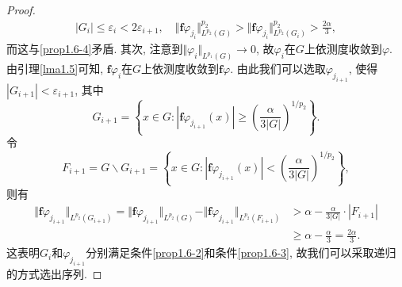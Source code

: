 \begin{proposition}
\begin{proof}
        \begin{align*}
            |G_i| \leq \varepsilon_i < 2\varepsilon_{i + 1}, \quad \Vert \bm{f}\varphi_{j_i}\Vert_{L^{p_2}(G)}^{p_2} > \Vert \bm{f}\varphi_{j_i}\Vert_{L^{p_2}(G_i)}^{p_2} > \frac{2\alpha}{3},
        \end{align*}
        而这与\ref{prop1.6-4}矛盾. 其次, 注意到$\Vert \varphi_i\Vert_{L^{p_1}(G)} \rightarrow 0$, 故$\varphi_i$在$G$上依测度收敛到$\varphi$. 由引理\ref{lma1.5}可知, $\bm{f}\varphi_i$在$G$上依测度收敛到$\bm{f}\varphi$. 由此我们可以选取$\varphi_{j_{i + 1}}$, 使得$|G_{i + 1}| < \varepsilon_{i + 1}$, 其中 
        \begin{equation*}
            G_{i + 1} = \left\{x \in G\colon |\bm{f}\varphi_{j_{i + 1}}(x)| \geq \left(\frac{\alpha}{3|G|}\right)^{1/p_2}\right\}.
        \end{equation*}
        令 
        \begin{equation*}
            F_{i + 1} = G \smallsetminus G_{i + 1} = \left\{x \in G\colon |\bm{f}\varphi_{j_{i + 1}}(x)| < \left(\frac{\alpha}{3|G|}\right)^{1/p_2}\right\},
        \end{equation*}
        则有
        \begin{align*}
            \Vert \bm{f}\varphi_{j_{i + 1}}\Vert_{L^{p_2}(G_{i + 1})} = \Vert \bm{f}\varphi_{j_{i + 1}}\Vert_{L^{p_2}(G)} - \Vert \bm{f}\varphi_{j_{i + 1}}\Vert_{L^{p_2}(F_{i + 1})} &> \alpha - \frac{\alpha}{3|G|} \cdot |F_{i + 1}| \\ 
            &\geq \alpha - \frac{\alpha}{3} = \frac{2\alpha}{3}.
        \end{align*}
        这表明$G_i$和$\varphi_{j_{i + 1}}$分别满足条件\ref{prop1.6-2}和条件\ref{prop1.6-3}, 故我们可以采取递归的方式选出序列.


\end{proof}
\end{proposition}
